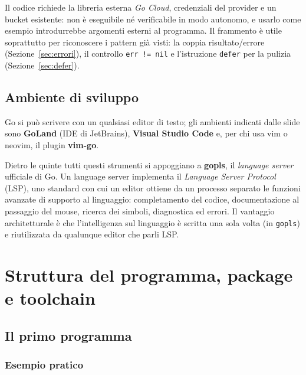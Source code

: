 \documentclass[11pt,a4paper]{report}
\newcommand{\cod}[1]{\texttt{#1}}
\begin{document}
\begin{nota}
Il codice richiede la libreria esterna \emph{Go Cloud}, credenziali del provider
e un bucket esistente: non è eseguibile né verificabile in modo autonomo, e
usarlo come esempio introdurrebbe argomenti esterni al programma. Il frammento
è utile soprattutto per riconoscere i pattern già visti: la
coppia risultato/errore (Sezione~\ref{sec:errori}), il controllo \cod{err != nil}
e l'istruzione \cod{defer} per la pulizia (Sezione~\ref{sec:defer}).
\end{nota}

\section{Ambiente di sviluppo}

Go si può scrivere con un qualsiasi editor di testo; gli ambienti indicati dalle
slide sono \textbf{GoLand} (IDE di JetBrains), \textbf{Visual Studio Code} e, per
chi usa vim o neovim, il plugin \textbf{vim-go}.

Dietro le quinte tutti questi strumenti si appoggiano a \textbf{gopls}, il
\emph{language server} ufficiale di Go. Un language server implementa il
\emph{Language Server Protocol} (LSP), uno standard con cui un editor
ottiene da un processo separato le funzioni avanzate di supporto al
linguaggio: completamento del codice, documentazione al passaggio del mouse,
ricerca dei simboli, diagnostica ed errori. Il vantaggio architetturale è che
l'intelligenza sul linguaggio è scritta una sola volta (in \cod{gopls}) e
riutilizzata da qualunque editor che parli LSP.

\chapter{Struttura del programma, package e toolchain}\label{ch:struttura}

\section{Il primo programma}

\subsection{Esempio pratico}
\end{document}

